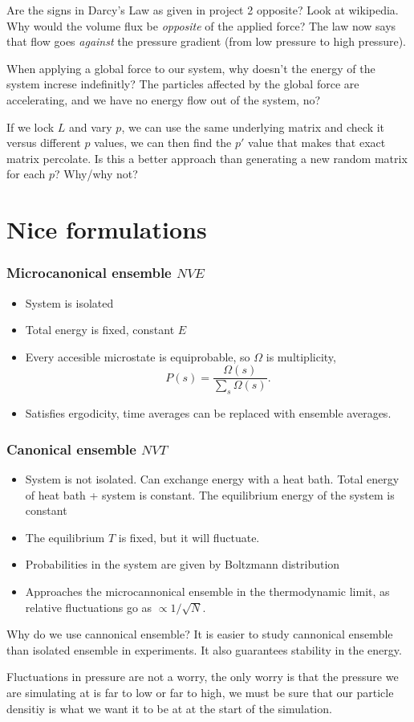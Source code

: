 \documentclass[a4paper, 11pt, notitlepage, english]{article}
\begin{document}
Are the signs in Darcy's Law as given in project 2 opposite? Look at wikipedia. Why would the volume flux be \emph{opposite} of the applied force? The law now says that flow goes \emph{against} the pressure gradient (from low pressure to high pressure).

When applying a global force to our system, why doesn't the energy of the system increse indefinitly? The particles affected by the global force are accelerating, and we have no energy flow out of the system, no?


If we lock $L$ and vary $p$, we can use the same underlying matrix and check it versus different $p$ values, we can then find the $p'$ value that makes that exact matrix percolate. Is this a better approach than generating a new random matrix for each $p$? Why/why not? 

\section*{Nice formulations}

\subsubsection*{Microcanonical ensemble $NVE$}
\begin{itemize}
	\item System is isolated
	\item Total energy is fixed, constant $E$
	\item Every accesible microstate is equiprobable, so $\Omega$ is multiplicity, 
	$$P(s) = \frac{\Omega(s)}{\sum_s \Omega(s)}.$$
	\item Satisfies ergodicity, time averages can be replaced with ensemble averages.
\end{itemize}

\subsubsection*{Canonical ensemble $NVT$}
\begin{itemize}
	\item System is not isolated. Can exchange energy with a heat bath. Total energy of heat bath + system is constant. The equilibrium energy of the system is constant
	\item The equilibrium $T$ is fixed, but it will fluctuate.
	\item Probabilities in the system are given by Boltzmann distribution
	\item Approaches the microcannonical ensemble in the thermodynamic limit, as relative fluctuations go as $\propto 1/\sqrt{N}$.
\end{itemize}

Why do we use cannonical ensemble? It is easier to study cannonical ensemble than isolated ensemble in experiments. It also guarantees stability in the energy.

Fluctuations in pressure are not a worry, the only worry is that the pressure we are simulating at is far to low or far to high, we must be sure that our particle densitiy is what we want it to be at at the start of the simulation.
\end{document}

